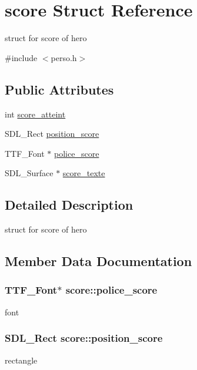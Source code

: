 \hypertarget{structscore}{}\section{score Struct Reference}
\label{structscore}


struct for score of hero  




{\ttfamily \#include $<$perso.\+h$>$}

\subsection*{Public Attributes}
\begin{DoxyCompactItemize}
\item 
int \hyperlink{structscore_a86ee1f22a5bf4e92781f2b2165aa0859}{score\+\_\+atteint}
\item 
S\+D\+L\+\_\+\+Rect \hyperlink{structscore_a444e826e64d1abf14dc0108095752cc1}{position\+\_\+score}
\item 
T\+T\+F\+\_\+\+Font $\ast$ \hyperlink{structscore_aa8088c00f0a0ce91db39deb03afc7110}{police\+\_\+score}
\item 
S\+D\+L\+\_\+\+Surface $\ast$ \hyperlink{structscore_aa5918332d1797da4bedaccfce5446b88}{score\+\_\+texte}
\end{DoxyCompactItemize}


\subsection{Detailed Description}
struct for score of hero 

\subsection{Member Data Documentation}
\subsubsection[{\texorpdfstring{police\+\_\+score}{police_score}}]{\setlength{\rightskip}{0pt plus 5cm}T\+T\+F\+\_\+\+Font$\ast$ score\+::police\+\_\+score}\hypertarget{structscore_aa8088c00f0a0ce91db39deb03afc7110}{}\label{structscore_aa8088c00f0a0ce91db39deb03afc7110}
font 
\subsubsection[{\texorpdfstring{position\+\_\+score}{position_score}}]{\setlength{\rightskip}{0pt plus 5cm}S\+D\+L\+\_\+\+Rect score\+::position\+\_\+score}\hypertarget{structscore_a444e826e64d1abf14dc0108095752cc1}{}\label{structscore_a444e826e64d1abf14dc0108095752cc1}
rectangle 

